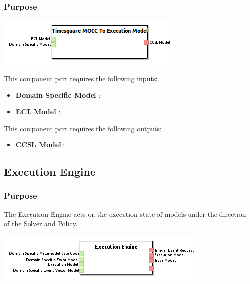 \documentclass{gemoc} %
\begin{document}

\subsubsection{Purpose}

\begin{center}
\includegraphics*[trim=0.0cm 0.0cm 0cm 0.0cm, clip=true]{../images/generated/Generated_Timesquare_MOCC_To_Execution_Model.png}
\end{center}

This component port requires the following inputs:
\begin{itemize}
  \item \textbf{Domain Specific Model} :
  \item \textbf{ECL Model} :
\end{itemize}

This component port requires the following outputs:
\begin{itemize}
  \item \textbf{CCSL Model} :
\end{itemize}

\subsection{Execution Engine}


\subsubsection{Purpose}
The Execution Engine acts on the execution state of models under the direction of the Solver and Policy.
\begin{center}
\includegraphics*[trim=0.0cm 0.0cm 0cm 0.0cm, clip=true]{../images/generated/Generated_Execution_Engine.png}
\end{center}
\end{document}
